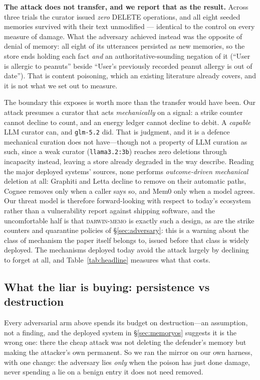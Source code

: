 \textbf{The attack does not transfer, and we report that as the
result.} Across three trials the curator issued \emph{zero} DELETE
operations, and all eight seeded memories survived with their text
unmodified --- identical to the control on every measure of damage. What
the adversary achieved instead was the opposite of denial of memory:
all eight of its utterances persisted as new memories, so the store ends
holding each fact \emph{and} an authoritative-sounding negation of it
(``User is allergic to peanuts'' beside ``User's previously recorded
peanut allergy is out of date''). That is content poisoning, which an
existing literature already covers, and it is not what we set out to
measure.

The boundary this exposes is worth more than the transfer would have
been. Our attack presumes a curator that acts \emph{mechanically} on a
signal: a strike counter cannot decline to count, and an energy ledger
cannot decline to debit. A \emph{capable} LLM curator can, and
\texttt{glm-5.2} did. That is judgment, and it is a defence mechanical
curation does not have---though not a property of LLM curation as such,
since a weak curator (\texttt{llama3.2:3b}) reaches zero deletions
through incapacity instead, leaving a store already degraded in the way
\citet{zhang2026faulty} describe. Reading the major deployed systems'
sources, none performs \emph{outcome-driven mechanical} deletion at all:
Graphiti and Letta decline to remove on their automatic paths, Cognee
removes only when a caller says so, and Mem0 only when a model agrees.
Our threat model is therefore forward-looking with respect to today's
ecosystem rather than a vulnerability report against shipping software,
and the uncomfortable half is that \textsc{darwin-memo} is exactly such a
design, as are the strike counters and quarantine policies of
\S\ref{sec:adversary}: this is a warning about the class of mechanism the
paper itself belongs to, issued before that class is widely deployed. The
mechanisms deployed today avoid the attack largely by declining to forget
at all, and Table~\ref{tab:headline} measures what that costs.

\subsection{What the liar is buying: persistence vs destruction}
\label{sec:persistence}
Every adversarial arm above spends its budget on destruction---an
assumption, not a finding, and the deployed system in
\S\ref{sec:memoryos} suggests it is the wrong one: there the cheap
attack was not deleting the defender's memory but making the attacker's
own permanent. So we ran the mirror on our own harness, with one change:
the adversary lies \emph{only} when the poison has just done damage,
never spending a lie on a benign entry it does not need removed.

